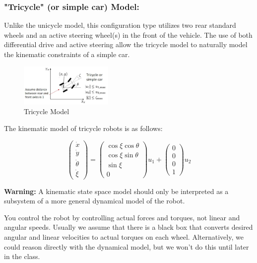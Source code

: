 \documentclass[twoside]{article}
\begin{document}
\subsubsection*{"Tricycle" (or simple car) Model:}

Unlike the unicycle model, this configuration type utilizes two rear standard wheels and an active steering wheel(s) in the front of the vehicle. The use of both differential drive and active steering allow the tricycle model to naturally model the kinematic constraints of a simple car\cite{sns}.

\begin{figure}[H]
\centering
\includegraphics[width=0.4\textwidth]{tricycle}
\caption{Tricycle Model}
\end{figure}

The kinematic model of tricycle robots is as follows:

\[ \begin{pmatrix}
\dot{x} \\ \dot{y} \\ \dot{\theta} \\ \dot{\xi}
\end{pmatrix} =
\begin{pmatrix} \cos \xi \cos \theta \\ \cos \xi \sin \theta \\ \sin \xi \\ 0 \end{pmatrix} u_1 + \begin{pmatrix} 0 \\ 0 \\ 0 \\ 1 \end{pmatrix} u_2
\]

\textbf{Warning:} A kinematic state space model should only be interpreted as a subsystem of a more general dynamical model of the robot. 

You control the robot by controlling actual forces and torques, not linear and angular speeds. Usually we assume that there is a black box that converts desired angular and linear velocities to actual torques on each wheel. Alternatively, we could reason directly with the dynamical model, but we won't do this until later in the class. 
\end{document}
